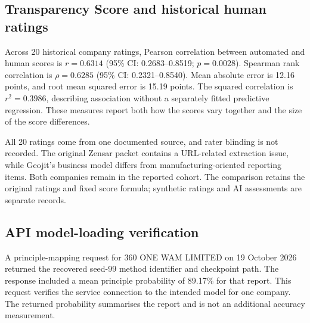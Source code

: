 \subsection{Transparency Score and historical human ratings}

Across 20 historical company ratings, Pearson correlation between automated and human scores is $r=0.6314$ (95\% CI: 0.2683--0.8519; $p=0.0028$). Spearman rank correlation is $\rho=0.6285$ (95\% CI: 0.2321--0.8540). Mean absolute error is 12.16 points, and root mean squared error is 15.19 points. The squared correlation is $r^2=0.3986$, describing association without a separately fitted predictive regression. These measures report both how the scores vary together and the size of the score differences.

All 20 ratings come from one documented source, and rater blinding is not recorded. The original Zensar packet contains a URL-related extraction issue, while Geojit's business model differs from manufacturing-oriented reporting items. Both companies remain in the reported cohort. The comparison retains the original ratings and fixed score formula; synthetic ratings and AI assessments are separate records.

\subsection{API model-loading verification}

A principle-mapping request for 360 ONE WAM LIMITED on 19 October 2026 returned the recovered seed-99 method identifier and checkpoint path. The response included a mean principle probability of 89.17\% for that report. This request verifies the service connection to the intended model for one company. The returned probability summarises the report and is not an additional accuracy measurement.

\FloatBarrier
